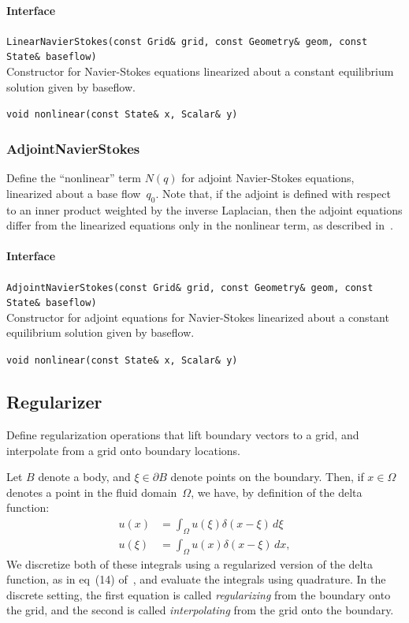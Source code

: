 \documentclass[11pt]{article}
\let\code\lstinline
\begin{document}
\paragraph{Interface}
\begin{description}
	\item \code|LinearNavierStokes(const Grid& grid, const Geometry& geom, const State& baseflow)|\\
		Constructor for Navier-Stokes equations linearized about a constant equilibrium solution given by baseflow.
	\item \code|void nonlinear(const State& x, Scalar& y)|
\end{description}

\subsubsection{AdjointNavierStokes}
Define the ``nonlinear'' term $N(q)$ for adjoint Navier-Stokes equations, linearized about a base flow~$q_0$.  Note that, if the adjoint is defined with respect to an inner product weighted by the inverse Laplacian, then the adjoint equations differ from the linearized equations only in the nonlinear term, as described in~\cite{AhuRow-08}.

\paragraph{Interface}
\begin{description}
	\item \code|AdjointNavierStokes(const Grid& grid, const Geometry& geom, const State& baseflow)|\\
		Constructor for adjoint equations for Navier-Stokes linearized about a constant equilibrium solution given by baseflow.
	\item \code|void nonlinear(const State& x, Scalar& y)|
\end{description}

\subsection{Regularizer}
Define regularization operations that lift boundary vectors to a grid, and interpolate from a grid onto boundary locations.

Let $B$ denote a body, and $\xi\in\partial B$ denote points on the boundary.  Then, if $x\in\Omega$ denotes a point in the fluid domain~$\Omega$, we have, by definition of the delta function:
\begin{align}
	u(x) &= \int_\Omega u(\xi) \delta(x-\xi)\,d\xi\\
	u(\xi) &= \int_\Omega u(x) \delta(x-\xi)\,dx,
\end{align}
We discretize both of these integrals using a regularized version of the delta function, as in eq~(14) of~\cite{TaiCol-06}, and evaluate the integrals using quadrature.  In the discrete setting, the first equation is called {\em regularizing} from the boundary onto the grid, and the second is called {\em interpolating} from the grid onto the boundary.
\end{document}
